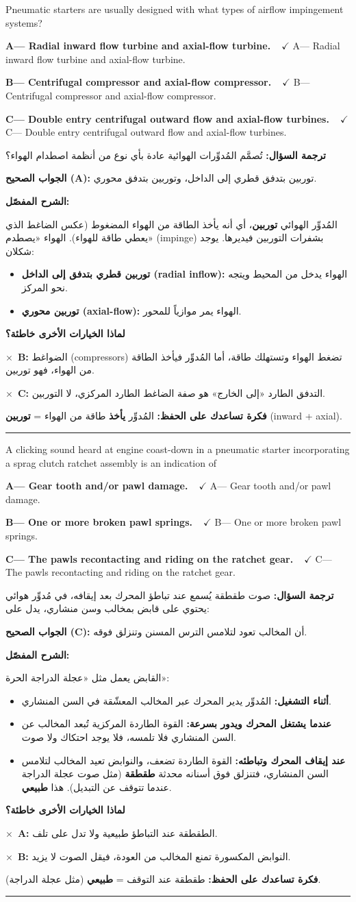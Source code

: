 \documentclass[11pt,a4paper]{article}
\newcommand{\en}[1]{\textenglish{#1}}
\newcommand{\correctletter}{}
\newcommand{\opt}[2]{%
  \ifdefstring{\correctletter}{#1}%
    {\textcolor{ansgreen}{\textbf{#1— #2\ \ $\checkmark$}}}%
    {#1— #2}\par}
\newcommand{\Q}[6]{%
  \renewcommand{\correctletter}{#6}%
  \par\bigskip
  \phantomsection\label{q#1}%
  \begin{tcolorbox}[enhanced,breakable,colback=qback,colframe=qframe,
      arc=2mm,boxrule=0.8pt,fonttitle=\bfseries,
      title={\en{Question #1}}]
    \begin{english}
      #2\par\smallskip
      \opt{A}{#3}\opt{B}{#4}\opt{C}{#5}
    \end{english}
  \end{tcolorbox}}
\newcommand{\tr}[1]{\textbf{\textcolor{qframe}{ترجمة السؤال:}} #1\par}
\newcommand{\ans}[2]{%
  \begin{tcolorbox}[colback=ansback,colframe=ansgreen,boxrule=0.6pt,arc=1.5mm,
      left=4pt,right=4pt,top=2pt,bottom=2pt]
    \textbf{\textcolor{ansgreen}{الجواب الصحيح (\en{#1}):}} #2
  \end{tcolorbox}}
\newcommand{\sharh}[1]{\textbf{\textcolor{conceptc}{الشرح المفصّل:}}\par #1\par}
\newcommand{\nohead}{\textbf{\textcolor{wrongc}{لماذا الخيارات الأخرى خاطئة؟}}\par}
\newcommand{\no}[2]{\hspace*{1em}\textcolor{wrongc}{$\times$}\ \textbf{\en{#1}:} #2\par}
\newcommand{\tip}[1]{%
  \begin{tcolorbox}[colback=tipback,colframe=tipframe,boxrule=0.5pt,arc=1.5mm,
      left=4pt,right=4pt,top=2pt,bottom=2pt]
    \textbf{فكرة تساعدك على الحفظ:} #1
  \end{tcolorbox}}
\newcommand{\qsep}{\par\medskip\noindent\textcolor{qframe!40}{\rule{\linewidth}{0.4pt}}\par}
\begin{document}
\Q{8627}{Pneumatic starters are usually designed with what types of airflow impingement systems?}
{Radial inward flow turbine and axial-flow turbine.}
{Centrifugal compressor and axial-flow compressor.}
{Double entry centrifugal outward flow and axial-flow turbines.}{A}
\tr{تُصمَّم المُدوِّرات الهوائية عادة بأي نوع من أنظمة اصطدام الهواء؟}
\ans{A}{توربين بتدفق قطري إلى الداخل، وتوربين بتدفق محوري.}
\sharh{المُدوِّر الهوائي \textbf{توربين}، أي أنه يأخذ الطاقة من الهواء المضغوط (عكس الضاغط الذي يعطي طاقة للهواء). الهواء «يصطدم» (\en{impinge}) بشفرات التوربين فيديرها. يوجد شكلان:
\begin{itemize}
  \item \textbf{توربين قطري بتدفق إلى الداخل (\en{radial inflow}):} الهواء يدخل من المحيط ويتجه نحو المركز.
  \item \textbf{توربين محوري (\en{axial-flow}):} الهواء يمر موازياً للمحور.
\end{itemize}}
\nohead
\no{B}{الضواغط (\en{compressors}) تضغط الهواء وتستهلك طاقة، أما المُدوِّر فيأخذ الطاقة من الهواء، فهو توربين.}
\no{C}{التدفق الطارد «إلى الخارج» هو صفة الضاغط الطارد المركزي، لا التوربين.}
\tip{المُدوِّر \textbf{يأخذ} طاقة من الهواء = \textbf{توربين} (\en{inward} + \en{axial}).}
\qsep

\Q{8626}{A clicking sound heard at engine coast-down in a pneumatic starter incorporating a sprag clutch ratchet assembly is an indication of}
{Gear tooth and/or pawl damage.}
{One or more broken pawl springs.}
{The pawls recontacting and riding on the ratchet gear.}{C}
\tr{صوت طقطقة يُسمع عند تباطؤ المحرك بعد إيقافه، في مُدوِّر هوائي يحتوي على قابض بمخالب وسن منشاري، يدل على:}
\ans{C}{أن المخالب تعود لتلامس الترس المسنن وتنزلق فوقه.}
\sharh{القابض يعمل مثل «عجلة الدراجة الحرة»:
\begin{itemize}
  \item \textbf{أثناء التشغيل:} المُدوِّر يدير المحرك عبر المخالب المعشّقة في السن المنشاري.
  \item \textbf{عندما يشتغل المحرك ويدور بسرعة:} القوة الطاردة المركزية تُبعد المخالب عن السن المنشاري فلا تلمسه، فلا يوجد احتكاك ولا صوت.
  \item \textbf{عند إيقاف المحرك وتباطئه:} القوة الطاردة تضعف، والنوابض تعيد المخالب لتلامس السن المنشاري، فتنزلق فوق أسنانه محدثة \textbf{طقطقة} (مثل صوت عجلة الدراجة عندما تتوقف عن التبديل). هذا \textbf{طبيعي}.
\end{itemize}}
\nohead
\no{A}{الطقطقة عند التباطؤ طبيعية ولا تدل على تلف.}
\no{B}{النوابض المكسورة تمنع المخالب من العودة، فيقل الصوت لا يزيد.}
\tip{طقطقة عند التوقف = \textbf{طبيعي} (مثل عجلة الدراجة).}
\qsep
\end{document}
